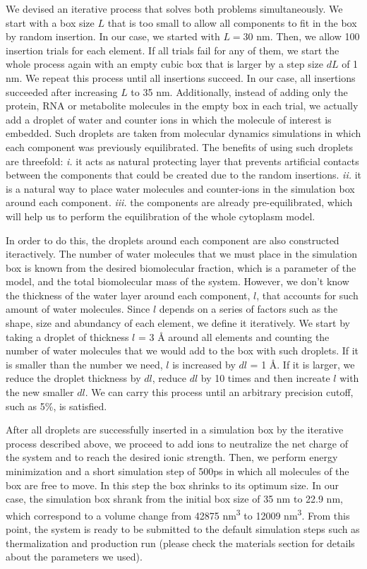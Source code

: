 \documentclass[journal=jacsat,manuscript=article]{achemso}
\begin{document}
We devised an iterative process that solves both problems simultaneously. We start with a box size $L$ that is too small to allow all components to fit in the box by random insertion. In our case, we started with $L = 30$ nm. Then, we allow 100 insertion trials for each element. If all trials fail for any of them, we start the whole process again with an empty cubic box that is larger by a step size $dL$ of 1 nm. We repeat this process until all insertions succeed. In our case, all insertions succeeded after increasing $L$ to 35 nm. Additionally, instead of adding only the protein, RNA or metabolite molecules in the empty box in each trial, we actually add a droplet of water and counter ions in which the molecule of interest is embedded. Such droplets are taken from molecular dynamics simulations in which each component was previously equilibrated. The benefits of using such droplets are threefold: \textit{i.} it acts as natural protecting layer that prevents artificial contacts between the components that could be created due to the random insertions. \textit{ii.} it is a natural way to place water molecules and counter-ions in the simulation box around each component. \textit{iii.} the components are already pre-equilibrated, which will help us to perform the equilibration of the whole cytoplasm model.

In order to do this, the droplets around each component are also constructed iteractively. The number of water molecules that we must place in the simulation box is known from the desired biomolecular fraction, which is a parameter of the model, and the total biomolecular mass of the system. However, we don't know the thickness of the water layer around each component, $l$, that accounts for such amount of water molecules. Since $l$ depends on a series of factors such as the shape, size and abundancy of each element, we define it iteratively. We start by taking a droplet of thickness $l$ = 3 \r{A} around all elements and counting the number of water molecules that we would add to the box with such droplets. If it is smaller than the number we need, $l$ is increased by $dl$ = 1 \r{A}. If it is larger, we reduce the droplet thickness by $dl$, reduce $dl$ by 10 times and then increate $l$ with the new smaller $dl$. We can carry this process until an arbitrary precision cutoff, such as 5\%, is satisfied.


After all droplets are successfully inserted in a simulation box by the iterative process described above, we proceed to add ions to neutralize the net charge of the system and to reach the desired ionic strength. Then, we perform energy minimization and a short simulation step of 500ps in which all molecules of the box are free to move. In this step the box shrinks to its optimum size. In our case, the simulation box shrank from the initial box size of 35 nm to 22.9 nm, which correspond to a volume change from 42875 nm\textsuperscript{3} to 12009 nm\textsuperscript{3}. From this point, the system is ready to be submitted to the default simulation steps such as thermalization and production run (please check the materials section for details about the parameters we used).
\end{document}
